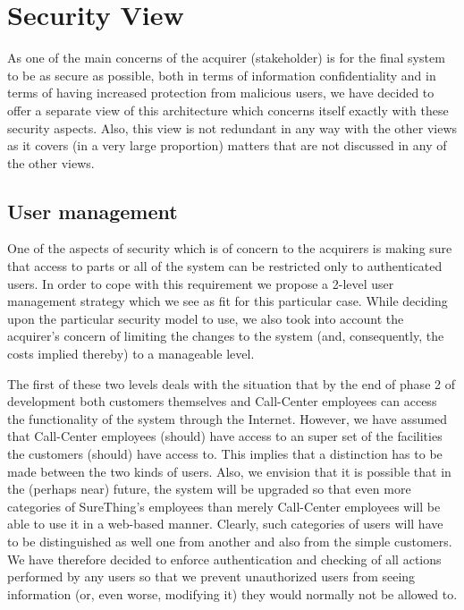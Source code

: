 \chapter{Security View}

As one of the main concerns of the acquirer (stakeholder) is for the final system to be as secure as possible, both in
terms of information confidentiality and in terms of having increased protection from malicious users, we have
decided to offer a separate view of this architecture which concerns itself exactly with these security aspects. Also,
this view is not redundant in any way with the other views as it covers (in a very large proportion) matters that
are not discussed in any of the other views.

\section{User management}

One of the aspects of security which is of concern to the acquirers is making sure that access to parts or all of the
system can be restricted only to authenticated users. In order to cope with this requirement we propose a 2-level
user management strategy which we see as fit for this particular case. While deciding upon the particular security
model to use, we also took into account the acquirer's concern of limiting the changes to the system (and,
consequently, the costs implied thereby) to a manageable level.

The first of these two levels deals with the situation that by the end of phase 2 of development both customers
themselves  and Call-Center employees can access the functionality of the system through the Internet. However,
we have assumed that Call-Center employees (should) have access to an super set of the facilities the customers
(should) have access to. This implies that a distinction has to be made between the two kinds of users. Also,
we envision that it is possible that in the (perhaps near) future, the system will be upgraded so that even more
categories of SureThing's employees than merely Call-Center employees will be able to use it in a web-based manner.
Clearly, such categories of users will have to be distinguished as well one from another and also from the simple
customers. We have therefore decided to enforce authentication and checking of all actions performed by any users
so that we prevent unauthorized users from seeing information (or, even worse, modifying it) they would normally
not be allowed to.

